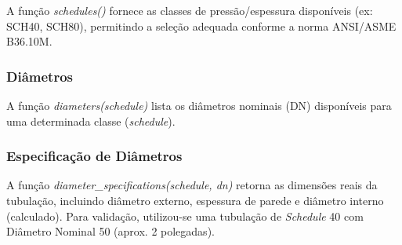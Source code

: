 A função \textit{schedules()} fornece as classes de pressão/espessura disponíveis (ex: SCH40, SCH80), permitindo a seleção adequada conforme a norma ANSI/ASME B36.10M.

\subsubsection{Diâmetros}

A função \textit{diameters(schedule)} lista os diâmetros nominais (DN) disponíveis para uma determinada classe (\textit{schedule}).

\subsubsection{Especificação de Diâmetros}

A função \textit{diameter\_specifications(schedule, dn)} retorna as dimensões reais da tubulação, incluindo diâmetro externo, espessura de parede e diâmetro interno (calculado).
Para validação, utilizou-se uma tubulação de \textit{Schedule} 40 com Diâmetro Nominal 50 (aprox. 2 polegadas).

